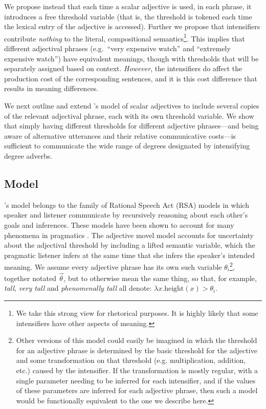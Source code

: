 \documentclass[10pt,letterpaper]{article}
\newcommand{\w}[1]{\emph{#1}}
\newcommand{\todo}[1]{{\color{red}#1}}
\begin{document}
We propose instead that each time a scalar adjective is used, in each phrase, it introduces a free threshold variable (that is, the threshold is \todo{tokened} each time the lexical entry of the adjective is accessed). Further we propose that intensifiers contribute \emph{nothing} to the literal, compositional semantics\footnote{We take this strong view for rhetorical purposes. It is highly likely that some intensifiers have other aspects of meaning.}. This implies that different adjectival phrases (e.g.~``very expensive watch'' and ``extremely expensive watch'') have equivalent meanings, though with thresholds that will be separately assigned based on context. \emph{However}, the intensifiers do affect the production cost of the corresponding sentences, and it is this cost difference that results in meaning differences.


We next outline and extend 's model of scalar adjectives to include several copies of the relevant adjectival phrase, each with its own threshold variable.
We show that simply having different thresholds for different adjective phrases---and being aware of alternative utterances and their relative communicative costs---is sufficient to communicate the wide range of degrees designated by intensifying degree adverbs.

\subsection{Model}

's model belongs to the family of Rational Speech Act (RSA) models in which speaker and listener communicate by recursively reasoning about each other's goals and inferences. These models have been shown to account for many phenomena in pragmatics \cite{frank, goodman}. The adjective movel model accounts for uncertainty about the adjectival threshold by including a lifted semantic variable, which the pragmatic listener infers at the same time that she infers the speaker's intended meaning. 
We assume every adjective phrase has its own such variable $\theta_i$\footnote{Other versions of this model could easily be imagined in which the threshold for an adjective phrase is determined by the basic threshold for the adjective and some transformation on that threshold (e.g. multiplication, addition, etc.) caused by the intensifier. If the transformation is mostly regular, with a single parameter needing to be inferred for each intensifier, and if the values of these parameters are inferred for each adjective phrase, then such a model would be functionally equivalent to the one we describe here.}, together notated $\vec{\theta}$, but to otherwise mean the same thing, so that, for example, \w{tall}, \w{very tall} and \w{phenomenally tall} all denote: $\lambda x . \text{height}(x) > \theta_i$.
\end{document}
